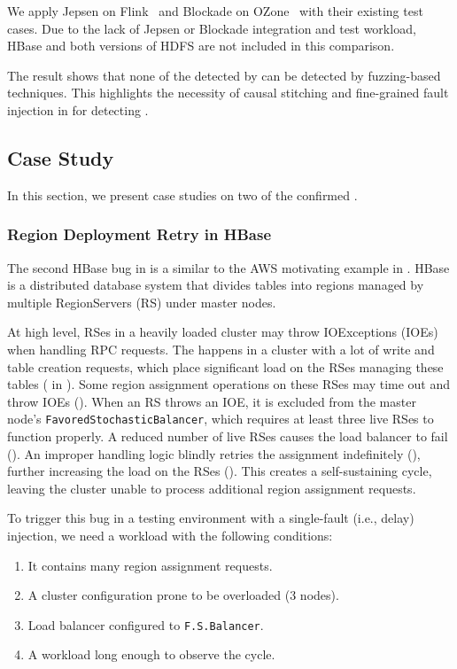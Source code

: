 We apply Jepsen on Flink~\cite{jepsenflink} and Blockade on OZone~\cite{blockaeozone} with their existing test cases. Due to the lack of Jepsen or Blockade integration and test workload, HBase and both versions of HDFS are not included in this comparison.

The result shows that none of the 
\vcs detected by \tool can be detected by fuzzing-based techniques. This highlights the necessity of causal stitching and fine-grained fault injection in \tool for detecting \vcs. 

\subsection{Case Study}
\label{sec:eval:case-study}

In this section, we present case studies on two of the confirmed \vcs.

\subsubsection{Region Deployment Retry in HBase}



The second HBase bug in  is a \vc 
similar to the AWS motivating example in . 
HBase is a distributed database system 
that divides tables into regions managed by multiple RegionServers (RS) under master nodes.

At high level, RSes in a heavily loaded cluster may throw IOExceptions (IOEs) when handling RPC requests. The \vc happens in a cluster with a lot of write and table creation requests, which place significant load on the RSes managing these tables ( in ). Some region assignment operations on these RSes may time out and throw IOEs (). 
When an RS throws an IOE, it is excluded from the master node's \texttt{Favored\-Stochastic\-Ba\-lan\-cer}, which requires at least three live RSes to function properly. A reduced number of live RSes causes the load balancer to fail (). 
An improper handling logic blindly retries the assignment indefinitely (), further increasing the load on the RSes (). This creates a self-sustaining cycle, leaving the cluster unable to process additional region assignment requests.


To trigger this bug in a testing environment with a single-fault (i.e., delay) injection, we need a workload with the following conditions:
\begin{enumerate}[leftmargin=5ex, noitemsep, topsep=0pt]
\item It contains many region assignment requests. 

\item A cluster configuration prone to be overloaded (3 nodes). 

\item Load balancer configured to \texttt{F.S.Balancer}. 

\item A workload long enough to observe the cycle. 
\end{enumerate}

